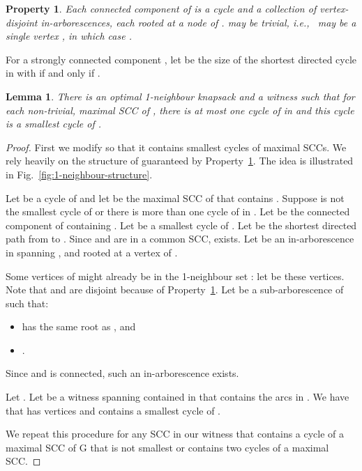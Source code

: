 \documentclass[12pt]{article}
\newtheorem{lemma}[theorem]{Lemma}
\newtheorem{property}[theorem]{Property}
\begin{document}
\begin{property}
\label{prop:structure}
Each connected component of  is a cycle  and a collection
of vertex-disjoint in-arborescences, each rooted at a node of .  
may be trivial, i.e.,~ may be a single vertex , in which case
.
\end{property}

For a strongly connected component , let  be the size of the
shortest directed cycle in  with  if and only if .

\begin{lemma}
\label{lem:scc-structure}
There is an optimal 1-neighbour knapsack  and a witness  such that
for each non-trivial, maximal SCC  of , there is at most one
cycle of  in  and this cycle is a smallest cycle of .
\end{lemma}





\begin{proof}
First we modify  so that it contains smallest cycles of maximal
SCCs.  We rely heavily on the structure of  guaranteed by
Property~\ref{prop:structure}.  The idea is illustrated
in Fig.~\ref{fig:1-neighbour-structure}.

Let  be a cycle of  and let  be the maximal SCC of 
that contains .  Suppose  is not the smallest cycle of  or
there is more than one cycle of  in .  Let  be the
connected component of  containing .  Let  be a smallest
cycle of .  Let  be the shortest directed path from  to
.  Since  and  are in a common SCC,  exists.  Let 
be an in-arborescence in  spanning ,  and  rooted at a
vertex of .

Some vertices of  might already be in the
1-neighbour set : let  be these vertices.  Note that  and  are
disjoint because of Property~\ref{prop:structure}.  Let  be a
sub-arborescence of  such that:
\begin{itemize}
\item  has the same root as , and
\item .
\end{itemize}
Since  and
 is connected, such an in-arborescence exists.

Let .  Let  be a witness
spanning  contained in  that contains the arcs in .  We
have that  has  vertices and contains a smallest cycle of
.

We repeat this procedure for any SCC in our witness that contains
a cycle of a maximal SCC of G that is not smallest or contains two
cycles of a maximal SCC.
\hfill  \end{proof}
\end{document}
